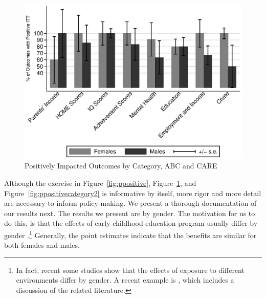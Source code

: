 \begin{figure}[H]
		\caption{Positively Impacted Outcomes by Category, ABC and CARE} \label{fig:ppositivecategory1}
		\includegraphics[width=.9\columnwidth]{output/itt_noctrl_cats1.eps}
\end{figure}

\noindent Although the exercise in Figure~\ref{fig:ppositive}, Figure~\ref{fig:ppositivecategory1}, and Figure~\ref{fig:ppositivecategory2} is informative by itself, more rigor and more detail are necessary to inform policy-making. We present a thorough documentation of our results next. The results we present are by gender. The motivation for us to do this, is that the effects of early-childhood education program usually differ by gender \citep{Heckman_Moon_etal_2010_QE,Campbell_Conti_etal_2014_EarlyChildhoodInvestments}.\footnote{In fact, recent some studies show that the effects of exposure to different environments differ by gender. A recent example is \citet{Autor-etal_2015_Family-Disadvantage}, which includes a discussion of the related literature.} Generally, the point estimates indicate that the benefits are similar for both females and males.\\

